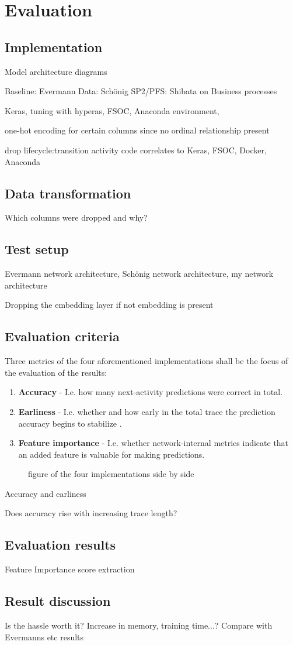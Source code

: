 \chapter{Evaluation}\label{sec:evaluation}


\section{Implementation}
Model architecture diagrams

Baseline: Evermann
Data: Schönig
SP2/PFS: Shibata on Business processes

Keras, tuning with hyperas, FSOC, Anaconda environment,

one-hot encoding for certain columns since no ordinal relationship present

drop lifecycle:transition
activity code correlates to 
Keras, FSOC, Docker, Anaconda

\section{Data transformation}
Which columns were dropped and why?

\section{Test setup}
Evermann network architecture, Schönig network architecture, my network architecture

Dropping the embedding layer if not embedding is present

\section{Evaluation criteria}
Three metrics of the four aforementioned implementations shall be the focus of the evaluation of the results:
\begin{enumerate}
    \item\textbf{Accuracy} - I.e. how many next-activity predictions were correct in total.
    \item\textbf{Earliness} - I.e. whether and how early in the total trace the prediction accuracy begins to stabilize \cite{francescomarino2015}.
    \item\textbf{Feature importance} - I.e. whether network-internal metrics indicate that an added feature is valuable for making predictions.
\end{enumerate}

\begin{figure}
    \centering
    \caption{figure of the four implementations side by side}
    \label{fig:my_label}
\end{figure}

Accuracy and earliness

Does accuracy rise with increasing trace length?

\section{Evaluation results}
Feature Importance score extraction

\section{Result discussion}
Is the hassle worth it?
Increase in memory, training time...?
Compare with Evermanns etc results